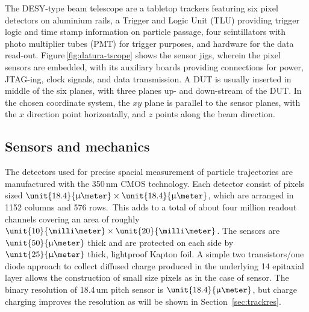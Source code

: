 
The DESY-type beam telescope are a tabletop trackers featuring six pixel detectors on aluminium rails, a Trigger and Logic Unit (TLU) providing trigger logic and time stamp information on particle passage,
 four scintillators with photo multiplier tubes (PMT) for trigger purposes, and hardware for the data read-out. 
Figure\,\ref{fig:datura-tscope} shows the sensor jigs, wherein the pixel sensors are embedded, with its auxiliary boards providing connections for power, JTAG-ing, clock signals, and data transmission.
A DUT is usually inserted in middle of the six planes, with three planes up- and down-stream of the DUT. 
In the chosen coordinate system, the $xy$ plane is parallel to the sensor planes, with the $x$ direction point horizontally, and $z$ points along the beam direction. 
 
\subsection{Sensors and mechanics}

The \Mimosa detectors used for precise spacial measurement of particle trajectories are manufactured with the 350\,nm CMOS technology. 
Each \Mimosa detector consist of pixels sized $\unit{18.4}{\upmu\meter} \times \unit{18.4}{\upmu\meter}$, which are arranged in 1152 columns and 576 rows.\,\cite{Mimosa26}
This adds to a total of about four million readout channels covering an area of roughly $\unit{10}{\milli\meter} \times \unit{20}{\milli\meter}$. 
The \Mimosa sensors are $\unit{50}{\upmu\meter}$ thick and are protected on each side by $\unit{25}{\upmu\meter}$ thick, lightproof Kapton foil. 
A simple two transistors/one diode approach to collect diffused charge produced in the underlying \unit{14}{\upmu\meter} epitaxial layer
 allows the construction of small size pixels as in the case of \Mimosa sensor.
The binary resolution of 18.4\,um pitch sensor is $\unit{18.4}{\upmu\meter}$, but charge charging improves the resolution as will be shown in Section~\ref{sec:trackres}.

